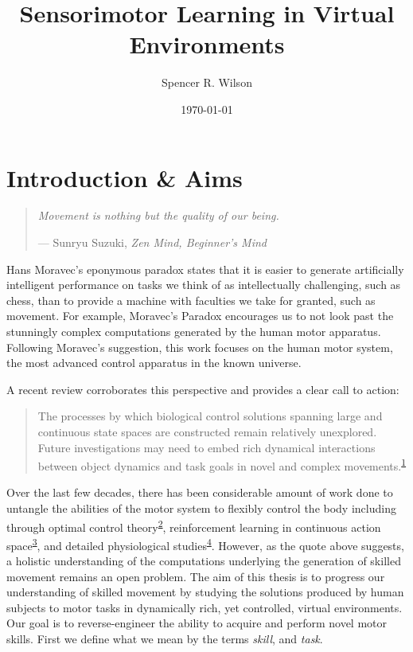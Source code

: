 \documentclass[
  a4paper,
]{article}
\title{Sensorimotor Learning in Virtual Environments}
\author{Spencer R. Wilson}
\date{\today}
\begin{document}
\maketitle

\hypertarget{sec:intro}{%
\section{Introduction \& Aims}\label{sec:intro}}

\begin{quote}
\emph{Movement is nothing but the quality of our being.}

--- Sunryu Suzuki, \emph{Zen Mind, Beginner's Mind}
\end{quote}

Hans Moravec's eponymous paradox states that it is easier to generate
artificially intelligent performance on tasks we think of as
intellectually challenging, such as chess, than to provide a machine
with faculties we take for granted, such as movement. For example,
Moravec's Paradox encourages us to not look past the stunningly complex
computations generated by the human motor apparatus. Following Moravec's
suggestion, this work focuses on the human motor system, the most
advanced control apparatus in the known universe.

A recent review corroborates this perspective and provides a clear call
to action:

\begin{quote}
The processes by which biological control solutions spanning large and
continuous state spaces are constructed remain relatively unexplored.
Future investigations may need to embed rich dynamical interactions
between object dynamics and task goals in novel and complex
movements.\textsuperscript{\protect\hyperlink{ref-McNamee2019}{1}}
\end{quote}

Over the last few decades, there has been considerable amount of work
done to untangle the abilities of the motor system to flexibly control
the body including through optimal control
theory\textsuperscript{\protect\hyperlink{ref-Todorov2004}{2}},
reinforcement learning in continuous action
space\textsuperscript{\protect\hyperlink{ref-koberReinforcementLearningRobotics2013}{3}},
and detailed physiological
studies\textsuperscript{\protect\hyperlink{ref-sauerbreiCorticalPatternGeneration2019}{4}}.
However, as the quote above suggests, a holistic understanding of the
computations underlying the generation of skilled movement remains an
open problem. The aim of this thesis is to progress our understanding of
skilled movement by studying the solutions produced by human subjects to
motor tasks in dynamically rich, yet controlled, virtual environments.
Our goal is to reverse-engineer the ability to acquire and perform novel
motor skills. First we define what we mean by the terms \emph{skill},
and \emph{task}.
\end{document}

